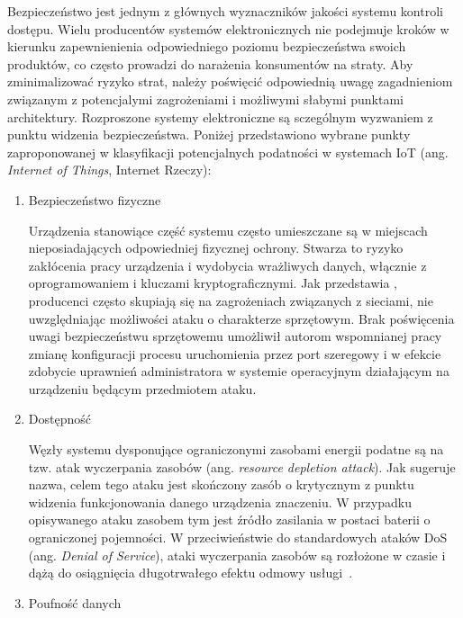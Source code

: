 
		Bezpieczeństwo jest jednym z głównych wyznaczników jakości systemu kontroli dostępu. Wielu producentów systemów elektronicznych nie podejmuje kroków w kierunku zapewnienienia odpowiedniego poziomu bezpieczeństwa swoich produktów, co często prowadzi do narażenia konsumentów na straty. Aby zminimalizować ryzyko strat, należy poświęcić odpowiednią uwagę zagadnieniom związanym z potencjalymi zagrożeniami i możliwymi słabymi punktami architektury. Rozproszone systemy elektroniczne są sczególnym wyzwaniem z punktu widzenia bezpieczeństwa. Poniżej przedstawiono wybrane punkty zaproponowanej w \cite{iot-vulnerabilities} klasyfikacji potencjalnych podatności w systemach IoT (ang. \textit{Internet of Things}, Internet Rzeczy):

		\begin{enumerate}[label=\Alph*.]
			\item Bezpieczeństwo fizyczne

				Urządzenia stanowiące część systemu często umieszczane są w miejscach nieposiadających odpowiedniej fizycznej ochrony. Stwarza to ryzyko zakłócenia pracy urządzenia i wydobycia wrażliwych danych, włącznie z oprogramowaniem i kluczami kryptograficznymi. Jak przedstawia \cite{iot-hardware-attack}, producenci często skupiają się na zagrożeniach związanych z sieciami, nie uwzględniając możliwości ataku o charakterze sprzętowym. Brak poświęcenia uwagi bezpieczeństwu sprzętowemu umożliwił autorom wspomnianej pracy zmianę konfiguracji procesu uruchomienia przez port szeregowy i w efekcie zdobycie uprawnień administratora w systemie operacyjnym działającym na urządzeniu będącym przedmiotem ataku.

			\item Dostępność

				Węzły systemu dysponujące ograniczonymi zasobami energii podatne są na tzw. atak wyczerpania zasobów (ang. \textit{resource depletion attack}). Jak sugeruje nazwa, celem tego ataku jest skończony zasób o krytycznym z punktu widzenia funkcjonowania danego urządzenia znaczeniu. W przypadku opisywanego ataku zasobem tym jest źródło zasilania w postaci baterii o ograniczonej pojemności. W przeciwieństwie do standardowych ataków DoS (ang. \textit{Denial of Service}), ataki wyczerpania zasobów są rozłożone w czasie i dążą do osiągnięcia długotrwałego efektu odmowy usługi~\cite{iot-rd-attack}.

			\item Poufność danych


\end{enumerate}
